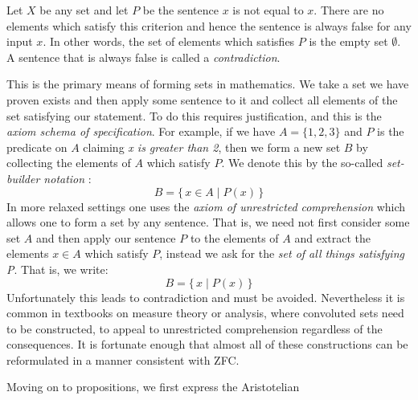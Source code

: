         \begin{example}
            Let $X$ be any set and let $P$ be the sentence $x$ is not equal to
            $x$. There are no elements which satisfy this criterion and hence
            the sentence is always false for any input $x$. In other words, the
            set of elements which satisfies $P$ is the empty set $\emptyset$.
            A sentence that is always false is called a
            \textit{contradiction}.
        \end{example}
        This is the primary means of forming sets in mathematics. We take a set
        we have proven exists and then apply some sentence to it and collect all
        elements of the set satisfying our statement. To do this requires
        justification, and this is the \textit{axiom schema of specification}.
        For example, if we have $A=\{1,2,3\}$ and $P$ is the predicate on $A$
        claiming \textit{x is greater than 2}, then we form a new set $B$ by
        collecting the elements of $A$ which satisfy $P$. We denote this by the
        so-called \textit{set-builder notation}%
        :
        \begin{equation}
            B=\{\,x\in{A}\;|\;P(x)\,\}
        \end{equation}
        In more relaxed settings one uses the \textit{axiom of unrestricted}
        \textit{comprehension} which
        allows one to form a set by any sentence. That is, we need not first
        consider some set $A$ and then apply our sentence $P$ to the elements of
        $A$ and extract the elements $x\in{A}$ which satisfy $P$, instead we
        ask for the \textit{set of all things satisfying P}. That is, we write:
        \begin{equation}
            B=\{\,x\;|\;P(x)\,\}
        \end{equation}
        Unfortunately this leads to contradiction and must be avoided.
        Nevertheless it is common in textbooks on measure theory or analysis,
        where convoluted sets need to be constructed, to appeal to unrestricted
        comprehension regardless of the consequences. It is fortunate enough
        that almost all of these constructions can be reformulated in a manner
        consistent with \gls{ZFC}.
        \par\hfill\par
        Moving on to propositions, we first express the Aristotelian
